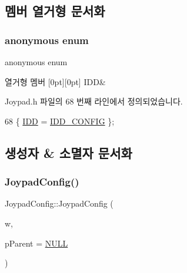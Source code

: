 \subsection{멤버 열거형 문서화}
\mbox{\label{class_joypad_config_a3de60b70a9e5b5a104211e300d388bea}} 
\subsubsection{\texorpdfstring{anonymous enum}{anonymous enum}}
{\footnotesize\ttfamily anonymous enum}

\begin{DoxyEnumFields}{열거형 멤버}
[0pt][0pt]{}\mbox{\label{class_joypad_config_a3de60b70a9e5b5a104211e300d388beaa3576d2df47b78d2eb08aaf607547efaf}} 
I\+DD&\\
\hline

\end{DoxyEnumFields}


Joypad.\+h 파일의 68 번째 라인에서 정의되었습니다.


\begin{DoxyCode}
68 \{ \mbox{\hyperlink{class_joypad_config_a3de60b70a9e5b5a104211e300d388beaa3576d2df47b78d2eb08aaf607547efaf}{IDD}} = \mbox{\hyperlink{resource_8h_ad23d26de7f6c160c194ef374e8e5472e}{IDD\_CONFIG}} \};
\end{DoxyCode}


\subsection{생성자 \& 소멸자 문서화}
\mbox{\label{class_joypad_config_ade281c386d18c3e9ab2d806cd89ab7ce}} 
\subsubsection{\texorpdfstring{Joypad\+Config()}{JoypadConfig()}}
{\footnotesize\ttfamily Joypad\+Config\+::\+Joypad\+Config (\begin{DoxyParamCaption}\item[{\mbox{\hyperlink{_util_8cpp_a0ef32aa8672df19503a49fab2d0c8071}{int}}}]{w,  }\item[{C\+Wnd $\ast$}]{p\+Parent = {\ttfamily \mbox{\hyperlink{_system_8h_a070d2ce7b6bb7e5c05602aa8c308d0c4}{N\+U\+LL}}} }\end{DoxyParamCaption})}




